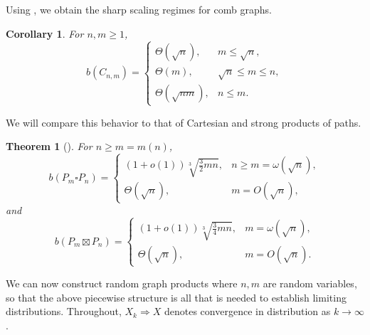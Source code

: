 \documentclass{article}
\newtheorem{theorem}{Theorem}
\newtheorem{corollary}{Corollary}
\begin{document}
Using , we obtain the sharp scaling regimes for comb graphs.

\begin{corollary}\label{cor: scaling}
For $n,m \ge 1$,
\[
    b(C_{n,m}) =
    \begin{cases}
        \Theta(\sqrt n), & m \le \sqrt n,\\[4pt]
        \Theta(m), & \sqrt n \le m \le n,\\[4pt]
        \Theta(\sqrt{nm}), & n \le m.
    \end{cases}
\]
\end{corollary}

We will compare this behavior to that of Cartesian and strong products of paths.

\begin{theorem}[{\cite{mitsche2017burning,mitsche2018burning}}]
\label{thm: grid products}
For $n\ge m=m(n)$,
\[
b(P_m \square P_n)=
\begin{cases}
(1+o(1))\sqrt[3]{\frac32mn}, & n \ge m=\omega(\sqrt n),\\[6pt]
\Theta(\sqrt n), & m=O(\sqrt n),
\end{cases}
\]
and
\[
b(P_m \boxtimes P_n)=
\begin{cases}
(1+o(1))\sqrt[3]{\frac34mn}, & m=\omega(\sqrt n),\\[6pt]
\Theta(\sqrt n), & m=O(\sqrt n).
\end{cases}
\]
\end{theorem}


We can now construct random graph products where $n,m$ are random variables, so that the above piecewise structure is all that is needed to establish limiting distributions. Throughout, $X_k \Rightarrow X$ denotes convergence in distribution as $k \to \infty$.
\end{document}
